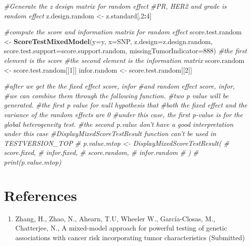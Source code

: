 \documentclass[11pt,]{article}
\newenvironment{Shaded}{\begin{snugshade}}{\end{snugshade}}
\newcommand{\KeywordTok}[1]{\textcolor[rgb]{0.13,0.29,0.53}{\textbf{#1}}}
\newcommand{\DataTypeTok}[1]{\textcolor[rgb]{0.13,0.29,0.53}{#1}}
\newcommand{\DecValTok}[1]{\textcolor[rgb]{0.00,0.00,0.81}{#1}}
\newcommand{\StringTok}[1]{\textcolor[rgb]{0.31,0.60,0.02}{#1}}
\newcommand{\CommentTok}[1]{\textcolor[rgb]{0.56,0.35,0.01}{\textit{#1}}}
\newcommand{\OperatorTok}[1]{\textcolor[rgb]{0.81,0.36,0.00}{\textbf{#1}}}
\newcommand{\NormalTok}[1]{#1}
\providecommand{\tightlist}{%
\setlength{\itemsep}{0pt}\setlength{\parskip}{0pt}}
\begin{document}
\begin{Shaded}
\begin{Highlighting}[]
\CommentTok{#Generate the z design matrix for random effect}
\CommentTok{#PR, HER2 and grade is random effect}
\NormalTok{z.design.random <-}\StringTok{ }\NormalTok{z.standard[,}\DecValTok{2}\OperatorTok{:}\DecValTok{4}\NormalTok{]}

\CommentTok{#compute the score and information matrix for random effect}
\NormalTok{score.test.random <-}\StringTok{ }\KeywordTok{ScoreTestMixedModel}\NormalTok{(}\DataTypeTok{y=}\NormalTok{y,}
                                         \DataTypeTok{x=}\NormalTok{SNP,}
                                         \DataTypeTok{z.design=}\NormalTok{z.design.random,}
                                         \DataTypeTok{score.test.support=}\NormalTok{score.support.random,}
                                         \DataTypeTok{missingTumorIndicator=}\DecValTok{888}\NormalTok{)}
\CommentTok{#the first element is the score}
\CommentTok{#the second element is the information matrix}
\NormalTok{score.random <-}\StringTok{ }\NormalTok{score.test.random[[}\DecValTok{1}\NormalTok{]]}
\NormalTok{infor.random <-}\StringTok{ }\NormalTok{score.test.random[[}\DecValTok{2}\NormalTok{]]}

\CommentTok{#after we get the the fixed effect score, infor }
\CommentTok{#and random effect score, infor, }
\CommentTok{#we can combine them through the following function. }
\CommentTok{#two p value will be generated.}
\CommentTok{#the first p value for null hypothesis that}
\CommentTok{#both the fixed effect and the variance of the random effects are 0}
\CommentTok{#under this case, the first p-value is for the global heterogeneity test.}
\CommentTok{#the second p.value don't have a good interpretation under this case}
\CommentTok{#DisplayMixedScoreTestResult function can't be used in TESTVERSION_TOP}
\CommentTok{# p.value.mtop <- DisplayMixedScoreTestResult(}
\CommentTok{#   score.fixed,}
\CommentTok{#   infor.fixed,}
\CommentTok{#   score.random,}
\CommentTok{#   infor.random}
\CommentTok{# )  }
\CommentTok{# print(p.value.mtop)}
\end{Highlighting}
\end{Shaded}

\section{References}\label{references}

\begin{enumerate}
\def\labelenumi{\arabic{enumi}.}
\tightlist
\item
  Zhang, H., Zhao, N., Ahearn, T.U, Wheeler W., García-Closas, M.,
  Chatterjee, N., A mixed-model approach for powerful testing of genetic
  associations with cancer risk incorporating tumor characteristics
  (Submitted)
\end{enumerate}




\newpage
\singlespacing 
\end{document}
